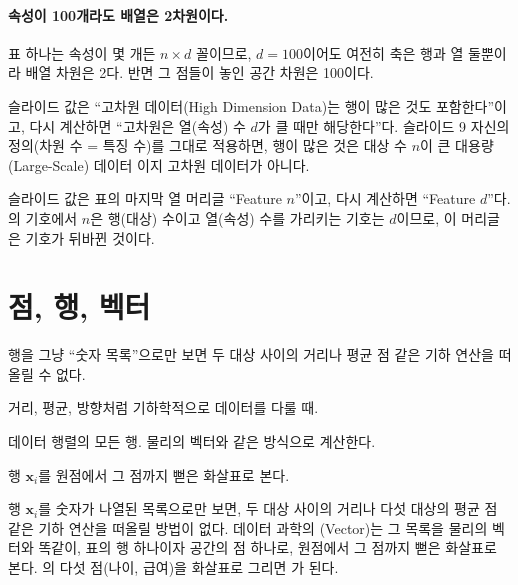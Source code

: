 \paragraph{속성이 100개라도 배열은 2차원이다.} 표 하나는 속성이 몇
개든 $n \times d$ 꼴이므로, $d = 100$이어도 여전히 축은 행과 열
둘뿐이라 배열 차원은 2다. 반면 그 점들이 놓인 공간 차원은 100이다.

\begin{pitfall}[슬라이드 12: 고차원 데이터 = 행이 많음?]
슬라이드 값은 ``고차원 데이터(High Dimension Data)는 행이 많은 것도
포함한다''이고, 다시 계산하면 ``고차원은 열(속성) 수 $d$가 클 때만
해당한다''다. 슬라이드 9 자신의 정의(차원 수 = 특징 수)를 그대로
적용하면, 행이 많은 것은 대상 수 $n$이 큰 대용량(Large-Scale) 데이터
이지 고차원 데이터가 아니다.
\end{pitfall}

\begin{pitfall}
슬라이드 값은 표의 마지막 열 머리글 ``Feature $n$''이고, 다시
계산하면 ``Feature $d$''다. 의 기호에서 $n$은
행(대상) 수이고 열(속성) 수를 가리키는 기호는 $d$이므로, 이 머리글은
기호가 뒤바뀐 것이다.
\end{pitfall}

\section{점, 행, 벡터}
\label{sec:vector}

\begin{inbrief}
  \item[Why] 행을 그냥 ``숫자 목록''으로만 보면 두 대상 사이의 거리나
             평균 점 같은 기하 연산을 떠올릴 수 없다.
  \item[When] 거리, 평균, 방향처럼 기하학적으로 데이터를 다룰 때.
  \item[Where] 데이터 행렬의 모든 행. 물리의 벡터와 같은 방식으로
               계산한다.
  \item[How] 행 $\mathbf{x}_i$를 원점에서 그 점까지 뻗은 화살표로
             본다.
\end{inbrief}

행 $\mathbf{x}_i$를 숫자가 나열된 목록으로만 보면, 두 대상 사이의
거리나 다섯 대상의 평균 점 같은 기하 연산을 떠올릴 방법이 없다.
데이터 과학의 (Vector)는 그 목록을 물리의 벡터와 똑같이,
표의 행 하나이자 공간의 점 하나로, 원점에서 그 점까지 뻗은 화살표로
본다.
의 다섯 점(나이, 급여)을 화살표로 그리면
가 된다.

